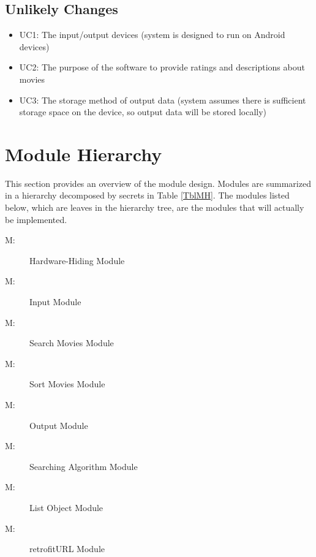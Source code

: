 \documentclass[12pt, titlepage]{article}
\newcounter{mnum}
\newcommand{\mthemnum}{M\themnum}
\begin{document}
\subsection{Unlikely Changes} \label{SecUchange}
\begin{itemize}
	\item UC1: The input/output devices (system is designed to run on Android devices) 
	\item UC2: The purpose of the software to provide ratings and descriptions about movies
	\item UC3: The storage method of output data (system assumes there is sufficient storage space on the device, so output data will be stored locally)
\end{itemize}

\section{Module Hierarchy} \label{SecMH}
This section provides an overview of the module design. Modules are summarized
in a hierarchy decomposed by secrets in Table \ref{TblMH}. The modules listed
below, which are leaves in the hierarchy tree, are the modules that will
actually be implemented.

\begin{description}
\item [ \mthemnum \label{mHH}:] Hardware-Hiding Module
\item[ \mthemnum \label{mHH}:] Input Module
\item[ \mthemnum \label{mHH}:] Search Movies Module
\item[ \mthemnum \label{mHH}:] Sort Movies Module
\item[ \mthemnum \label{mHH}:] Output Module
\item[ \mthemnum \label{mHH}:] Searching Algorithm Module
\item[ \mthemnum \label{mHH}:] List Object Module
\item[ \mthemnum \label{mHH}:] retrofitURL Module
\end{description}
\end{document}
